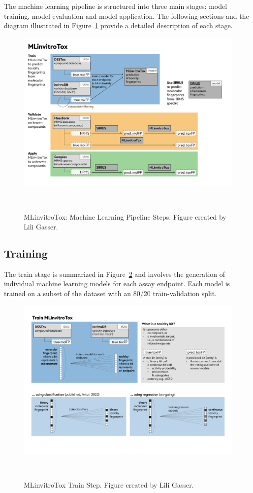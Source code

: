 The machine learning pipeline is structured into three main stages: model training, model evaluation and model application. The following sections and the diagram illustrated in Figure~\ref{fig:Project_overview} provide a detailed description of each stage.

\begin{figure}
    \centering
    \includegraphics[width=1.0\textwidth]{figures/Project_overview.png}
    \caption{MLinvitroTox: Machine Learning Pipeline Steps. Figure created by Lili Gasser.}
~\label{fig:Project_overview}
\end{figure}

\subsection{Training}
The train stage is summarized in Figure~\ref{fig:Project_overview_train} and involves the generation of individual machine learning models for each assay endpoint. Each model is trained on a subset of the dataset with an 80/20 train-validation split. 

\begin{figure} 
    \centering
    \includegraphics[width=1.0\textwidth]{figures/Project_overview_train.png}
    \caption{MLinvitroTox Train Step. Figure created by Lili Gasser.}
~\label{fig:Project_overview_train}
\end{figure}


